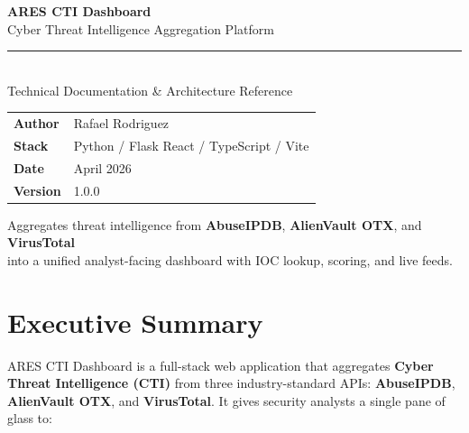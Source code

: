 \documentclass[11pt,a4paper]{article}
\begin{document}
\begin{titlepage}
\centering
\vspace*{2.5cm}

{\Huge\bfseries\color{sectionblue} ARES CTI Dashboard}\\[12pt]
{\Large\color{textmuted} Cyber Threat Intelligence Aggregation Platform}\\[0.5cm]
\textcolor{border}{\rule{10cm}{0.4pt}}\\[0.5cm]
{\large Technical Documentation \& Architecture Reference}\\[1.5cm]

\begin{tabular}{ll}
\textbf{Author}  & Rafael Rodriguez \\[4pt]
\textbf{Stack}   & Python / Flask \quad React / TypeScript / Vite \\[4pt]
\textbf{Date}    & April 2026 \\[4pt]
\textbf{Version} & 1.0.0 \\
\end{tabular}

\vspace{2cm}
\begin{mdframed}[linecolor=border,linewidth=1pt,roundcorner=6pt,
                 innerleftmargin=20pt,innerrightmargin=20pt,
                 innertopmargin=12pt,innerbottommargin=12pt]
\centering
Aggregates threat intelligence from \textbf{AbuseIPDB}, \textbf{AlienVault OTX}, and \textbf{VirusTotal}\\
into a unified analyst-facing dashboard with IOC lookup, scoring, and live feeds.
\end{mdframed}

\end{titlepage}

\tableofcontents
\newpage

\section{Executive Summary}

ARES CTI Dashboard is a full-stack web application that aggregates \textbf{Cyber Threat Intelligence (CTI)} from three industry-standard APIs:
\textbf{AbuseIPDB}, \textbf{AlienVault OTX}, and \textbf{VirusTotal}. It gives security analysts a single pane of glass to:
\end{document}
